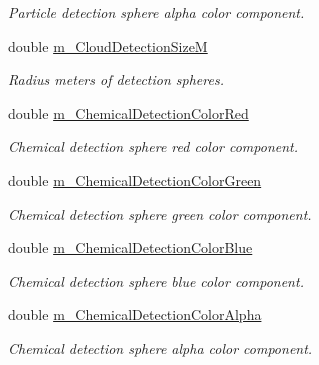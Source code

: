 \begin{DoxyCompactItemize}
\begin{DoxyCompactList}\small\item\em Particle detection sphere alpha color component. \end{DoxyCompactList}\item 
\hypertarget{class_cloud_detection_belief_ac8a7755a9b678e1c76cfa97bfb11de87}{
double \hyperlink{class_cloud_detection_belief_ac8a7755a9b678e1c76cfa97bfb11de87}{m\_\-CloudDetectionSizeM}}
\label{class_cloud_detection_belief_ac8a7755a9b678e1c76cfa97bfb11de87}

\begin{DoxyCompactList}\small\item\em Radius meters of detection spheres. \end{DoxyCompactList}\item 
\hypertarget{class_cloud_detection_belief_aa37cc6619a8bfb97c75a29658b2616bb}{
double \hyperlink{class_cloud_detection_belief_aa37cc6619a8bfb97c75a29658b2616bb}{m\_\-ChemicalDetectionColorRed}}
\label{class_cloud_detection_belief_aa37cc6619a8bfb97c75a29658b2616bb}

\begin{DoxyCompactList}\small\item\em Chemical detection sphere red color component. \end{DoxyCompactList}\item 
\hypertarget{class_cloud_detection_belief_acf991b8ee27b2337390c23c32c473494}{
double \hyperlink{class_cloud_detection_belief_acf991b8ee27b2337390c23c32c473494}{m\_\-ChemicalDetectionColorGreen}}
\label{class_cloud_detection_belief_acf991b8ee27b2337390c23c32c473494}

\begin{DoxyCompactList}\small\item\em Chemical detection sphere green color component. \end{DoxyCompactList}\item 
\hypertarget{class_cloud_detection_belief_a6770d83085eb1673e76ad9a6044dbc21}{
double \hyperlink{class_cloud_detection_belief_a6770d83085eb1673e76ad9a6044dbc21}{m\_\-ChemicalDetectionColorBlue}}
\label{class_cloud_detection_belief_a6770d83085eb1673e76ad9a6044dbc21}

\begin{DoxyCompactList}\small\item\em Chemical detection sphere blue color component. \end{DoxyCompactList}\item 
\hypertarget{class_cloud_detection_belief_abb07237a2a032d51face77da8249103b}{
double \hyperlink{class_cloud_detection_belief_abb07237a2a032d51face77da8249103b}{m\_\-ChemicalDetectionColorAlpha}}
\label{class_cloud_detection_belief_abb07237a2a032d51face77da8249103b}

\begin{DoxyCompactList}\small\item\em Chemical detection sphere alpha color component. \end{DoxyCompactList}\end{DoxyCompactItemize}


